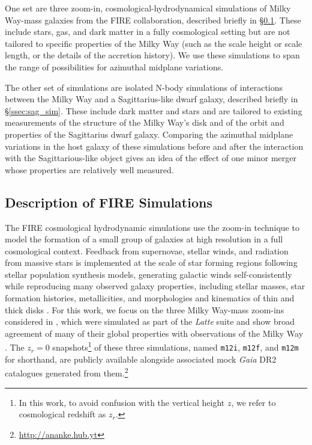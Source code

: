 \documentclass[twocolumn]{aastex62}
\newcommand{\mi}{\texttt{m12i}}
\newcommand{\mf}{\texttt{m12f}}
\newcommand{\mm}{\texttt{m12m}}
\newcommand{\z}{z_r}
\begin{document}
One set are three zoom-in, cosmological-hydrodynamical simulations of Milky Way-mass galaxies from the FIRE collaboration, described briefly in \S \ref{ssec:cosmozoom}. These include stars, gas, and dark matter in a fully cosmological setting but are not tailored to specific properties of the Milky Way (such as the scale height or scale length, or the details of the accretion history). We use these simulations to span the range of possibilities for azimuthal midplane variations.

The other set of simulations are isolated N-body simulations of interactions between the Milky Way and a Sagittarius-like dwarf galaxy, described briefly in \S \ref{ssec:sag_sim}. These include dark matter and stars and are tailored to existing measurements of the structure of the Milky Way's disk and of the orbit and properties of the Sagittarius dwarf galaxy. Comparing the azimuthal midplane variations in the host galaxy of these simulations before and after the interaction with the Sagittarious-like object gives an idea of the effect of one minor merger whose properties are relatively well measured.

\subsection{Description of FIRE Simulations} \label{ssec:cosmozoom}
The FIRE cosmological hydrodynamic simulations
\citep{2014MNRAS.445..581H,2018MNRAS.480..800H} use the zoom-in technique
\citep[e.g.][]{1993ApJ...412..455K,2014MNRAS.437.1894O} to model the formation
of a small group of galaxies at high resolution in a full cosmological
context.  Feedback from supernovae, stellar winds, and radiation from massive
stars is implemented at the scale of star forming regions following stellar
population synthesis models, generating galactic winds self-consistently
\citep{2015MNRAS.454.2691M, 2017MNRAS.470.4698A} while reproducing many
observed galaxy properties, including stellar masses, star formation
histories, metallicities, and morphologies and kinematics of thin and thick
disks \citep{2014MNRAS.445..581H, 2016MNRAS.456.2140M, 2017MNRAS.467.2430M,
2016ApJ...827L..23W, 2018MNRAS.481.4133G, 2018MNRAS.480..800H}. For this work,
we focus on the three Milky Way-mass zoom-ins considered in
\citet{2018arXiv180610564S}, which were simulated as part of the
\textit{Latte} suite and show broad agreement of many of their global
properties with observations of the Milky Way \citep{2016ApJ...827L..23W,
2018MNRAS.481.4133G}. The $\z = 0$ snapshots\footnote{In this work, to avoid
confusion with the vertical height $z$, we refer to cosmological redshift as
$\z$.} of these three simulations, named \mi{}, \mf{}, and \mm{} for
shorthand, are publicly available alongside associated mock \textit{Gaia} DR2
catalogues generated from them.\footnote{\url{http://ananke.hub.yt}}
\end{document}
